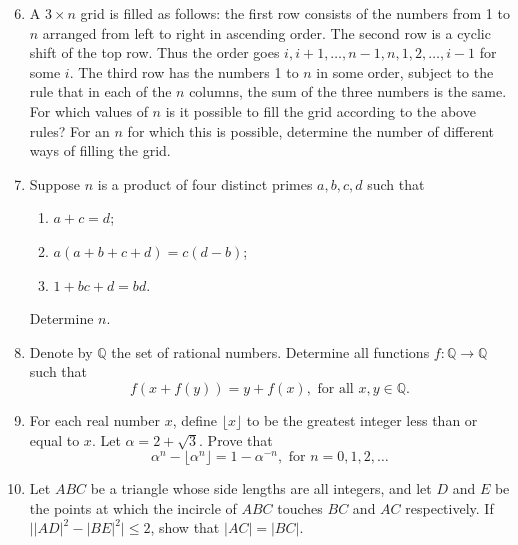 \documentclass[12pt]{article}
\begin{document}
\begin{enumerate}
\setcounter{enumi}{5}
\item A $3 \times n$ grid is filled as follows: the first row consists of the numbers from 1 to $n$ arranged from left to right in ascending order. The second row is a cyclic shift of the top row. Thus the order goes $i, i+1, \ldots, n-1, n, 1, 2, \ldots, i-1$ for some $i$. The third row has the numbers 1 to $n$ in some order, subject to the rule that in each of the $n$ columns, the sum of the three numbers is the same.
For which values of $n$ is it possible to fill the grid according to the above rules? For an $n$ for which this is possible, determine the number of different ways of filling the grid.

\item Suppose $n$ is a product of four distinct primes $a, b, c, d$ such that
\begin{enumerate}
\item[(a)] $a + c = d$;
\item[(b)] $a(a + b + c + d) = c(d - b)$;
\item[(c)] $1 + bc + d = bd$.
\end{enumerate}
Determine $n$.

\item Denote by $\mathbb{Q}$ the set of rational numbers. Determine all functions $f : \mathbb{Q} \longrightarrow \mathbb{Q}$ such that
\[
f(x + f(y)) = y + f(x), \text{ for all } x, y \in \mathbb{Q}.
\]

\item For each real number $x$, define $\lfloor x \rfloor$ to be the greatest integer less than or equal to $x$.
Let $\alpha = 2 + \sqrt{3}$. Prove that
\[
\alpha^n - \lfloor \alpha^n \rfloor = 1 - \alpha^{-n}, \text{ for } n = 0, 1, 2, \ldots
\]

\item Let $ABC$ be a triangle whose side lengths are all integers, and let $D$ and $E$ be the points at which the incircle of $ABC$ touches $BC$ and $AC$ respectively. If $\bigl||AD|^2 - |BE|^2\bigr| \leq 2$, show that $|AC| = |BC|$.

\end{enumerate}
\end{document}
